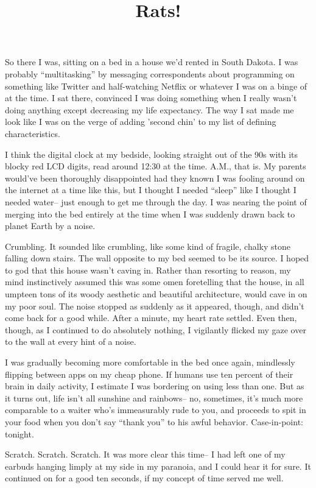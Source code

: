 \documentclass[12pt]{article}
\title{Rats!}
\begin{document}
\makeheader
\hspace{0.5in}
So there I was, sitting on a bed in a house we'd rented in South Dakota.  I was probably ``multitasking'' by messaging correspondents about programming on something like Twitter and half-watching Netflix or whatever I was on a binge of at the time.  I sat there, convinced I was doing something when I really wasn't doing anything except decreasing my life expectancy.  The way I sat made me look like I was on the verge of adding 'second chin' to my list of defining characteristics.

I think the digital clock at my bedside, looking straight out of the 90s with its blocky red LCD digits, read around 12:30 at the time.  A.M., that is.  My parents would've been thoroughly disappointed had they known I was fooling around on the internet at a time like this, but I thought I needed ``sleep'' like I thought I needed water--  just enough to get me through the day.  I was nearing the point of merging into the bed entirely at the time when I was suddenly drawn back to planet Earth by a noise.

Crumbling.  It sounded like crumbling, like some kind of fragile, chalky stone falling down stairs.  The wall opposite to my bed seemed to be its source.  I hoped to god that this house wasn't caving in.  Rather than resorting to reason, my mind instinctively assumed this was some omen foretelling that the house, in all umpteen tons of its woody aesthetic and beautiful architecture, would cave in on my poor soul.  The noise stopped as suddenly as it appeared, though, and didn't come back for a good while.  After a minute, my heart rate settled.  Even then, though, as I continued to do absolutely nothing, I vigilantly flicked my gaze over to the wall at every hint of a noise.

I was gradually becoming more comfortable in the bed once again, mindlessly flipping between apps on my cheap phone.  If humans use ten percent of their brain in daily activity, I estimate I was bordering on using less than one.  But as it turns out, life isn't all sunshine and rainbows-- no, sometimes, it's much more comparable to a waiter who's immeasurably rude to you, and proceeds to spit in your food when you don't say ``thank you'' to his awful behavior.  Case-in-point:  tonight.

Scratch.  Scratch.  Scratch.  It was more clear this time-- I had left one of my earbuds hanging limply at my side in my paranoia, and I could hear it for sure.  It continued on for a good ten seconds, if my concept of time served me well.
\end{document}
